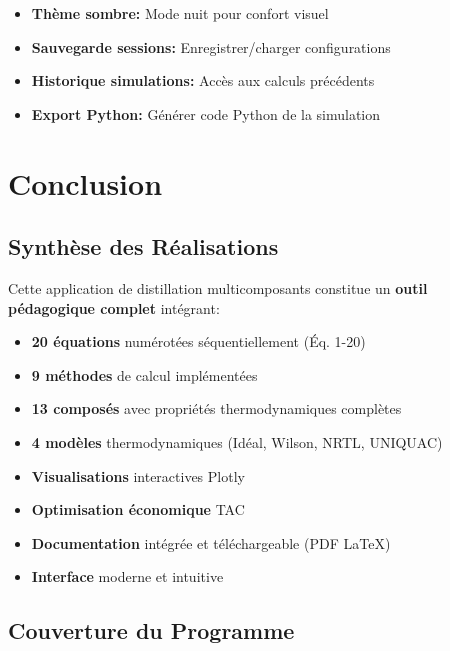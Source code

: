 \documentclass[11pt,a4paper]{article}
\begin{document}
\begin{itemize}[leftmargin=*]
    \item \textbf{Thème sombre:} Mode nuit pour confort visuel
    \item \textbf{Sauvegarde sessions:} Enregistrer/charger configurations
    \item \textbf{Historique simulations:} Accès aux calculs précédents
    \item \textbf{Export Python:} Générer code Python de la simulation
\end{itemize}

\section{Conclusion}

\subsection{Synthèse des Réalisations}

Cette application de distillation multicomposants constitue un \textbf{outil pédagogique complet} intégrant:

\begin{tcolorbox}[colback=green!10,colframe=green!50!black,title=Réalisations Majeures]
\begin{itemize}[leftmargin=*]
    \item \textbf{20 équations} numérotées séquentiellement (Éq. 1-20)
    \item \textbf{9 méthodes} de calcul implémentées
    \item \textbf{13 composés} avec propriétés thermodynamiques complètes
    \item \textbf{4 modèles} thermodynamiques (Idéal, Wilson, NRTL, UNIQUAC)
    \item \textbf{Visualisations} interactives Plotly
    \item \textbf{Optimisation économique} TAC
    \item \textbf{Documentation} intégrée et téléchargeable (PDF LaTeX)
    \item \textbf{Interface} moderne et intuitive
\end{itemize}
\end{tcolorbox}

\subsection{Couverture du Programme}
\end{document}
